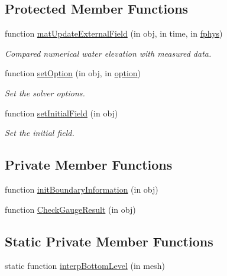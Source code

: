 \subsection*{Protected Member Functions}
\begin{DoxyCompactItemize}
\item 
function \hyperlink{class_tsunami_runup2d_a559a40b67f452390e93970e3d0fcecf4}{mat\+Update\+External\+Field} (in obj, in time, in \hyperlink{class_ndg_phys_a6b25724fc9474d32018439009072f0a9}{fphys})
\begin{DoxyCompactList}\small\item\em Compared numerical water elevation with measured data. \end{DoxyCompactList}\item 
function \hyperlink{class_tsunami_runup2d_a732962d97ab5e76c32392ba08fe44a67}{set\+Option} (in obj, in \hyperlink{class_ndg_phys_af91f4c54b93504e76b38a5693774dff1}{option})
\begin{DoxyCompactList}\small\item\em Set the solver options. \end{DoxyCompactList}\item 
function \hyperlink{class_tsunami_runup2d_a42a43699f5c54091cc72e49149a7e673}{set\+Initial\+Field} (in obj)
\begin{DoxyCompactList}\small\item\em Set the initial field. \end{DoxyCompactList}\end{DoxyCompactItemize}
\subsection*{Private Member Functions}
\begin{DoxyCompactItemize}
\item 
function \hyperlink{class_tsunami_runup2d_acd916999a37b7d7a06cfce2364de6eb3}{init\+Boundary\+Information} (in obj)
\item 
function \hyperlink{class_tsunami_runup2d_a3cc80b43a2178df18cfd96eec441a009}{Check\+Gauge\+Result} (in obj)
\end{DoxyCompactItemize}
\subsection*{Static Private Member Functions}
\begin{DoxyCompactItemize}
\item 
static function \hyperlink{class_tsunami_runup2d_ac96f25335e177d8eae5f22c0f555e4c3}{interp\+Bottom\+Level} (in mesh)
\end{DoxyCompactItemize}
